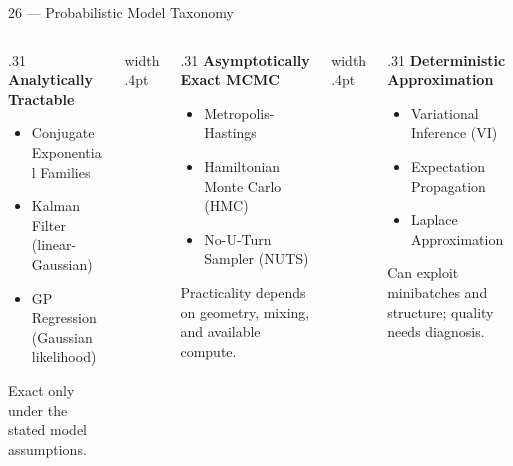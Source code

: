 \documentclass[aspectratio=169,10pt]{beamer}
\begin{document}
\begin{frame}{26 — Probabilistic Model Taxonomy}
  \begin{columns}[T,onlytextwidth]
    \begin{column}{.31\textwidth}
      {\small\bfseries\color{BayesTeal}Analytically Tractable}\par\BayesSmallGap
      {\footnotesize
        \begin{itemize}\setlength{\itemsep}{.2em}
          \item Conjugate Exponential Families
          \item Kalman Filter (linear-Gaussian)
          \item GP Regression (Gaussian likelihood)
        \end{itemize}
      }
      \BayesSmallGap
      {\scriptsize\color{BayesMuted}Exact only under the stated model assumptions.}
    \end{column}
    \hfill{\color{BayesBorder}\vrule width .4pt}\hfill
    \begin{column}{.31\textwidth}
      {\small\bfseries\color{BayesBlue}Asymptotically Exact MCMC}\par\BayesSmallGap
      {\footnotesize
        \begin{itemize}\setlength{\itemsep}{.2em}
          \item Metropolis-Hastings
          \item Hamiltonian Monte Carlo (HMC)
          \item No-U-Turn Sampler (NUTS)
        \end{itemize}
      }
      \BayesSmallGap
      {\scriptsize\color{BayesMuted}Practicality depends on geometry, mixing, and available compute.}
    \end{column}
    \hfill{\color{BayesBorder}\vrule width .4pt}\hfill
    \begin{column}{.31\textwidth}
      {\small\bfseries\color{BayesAmber}Deterministic Approximation}\par\BayesSmallGap
      {\footnotesize
        \begin{itemize}\setlength{\itemsep}{.2em}
          \item Variational Inference (VI)
          \item Expectation Propagation
          \item Laplace Approximation
        \end{itemize}
      }
      \BayesSmallGap
      {\scriptsize\color{BayesMuted}Can exploit minibatches and structure; quality needs diagnosis.}
    \end{column}
  \end{columns}
  \vfill
\end{frame}
\end{document}
